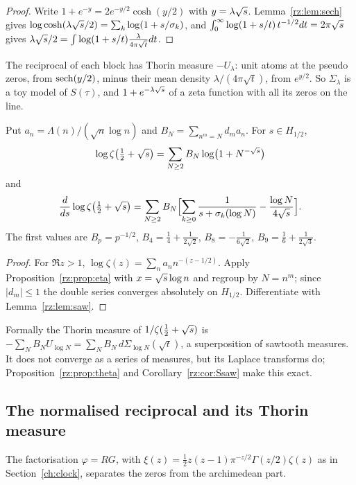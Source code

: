 \begin{proof}
Write $1+e^{-y}=2e^{-y/2}\cosh(y/2)$ with $y=\lambda\sqrt{s}$. Lemma~\ref{rz:lem:sech} gives $\log\cosh(\lambda\sqrt{s}/2)=\sum_k\log(1+s/\sigma_k)$, and $\int_0^\infty\log(1+s/t)\,t^{-1/2}dt=2\pi\sqrt{s}$ gives $\lambda\sqrt{s}/2=\int\log(1+s/t)\frac{\lambda}{4\pi\sqrt t}dt$.
\end{proof}

The reciprocal of each block has Thorin measure $-U_\lambda$: unit atoms at the pseudo zeros, from $\operatorname{sech}(y/2)$, minus their mean density $\lambda/(4\pi\sqrt t)$, from $e^{y/2}$. So $\Sigma_\lambda$ is a toy model of $S(\tau)$, and $1+e^{-\lambda\sqrt{s}}$ of a zeta function with all its zeros on the line.

\begin{theorem}\label{rz:thm:saw}
Put $a_n=\Lambda(n)/(\sqrt n\log n)$ and $B_N=\sum_{n^m=N}d_m a_n$. For $s\in H_{1/2}$,
\[
\log\zeta\bigl(\tfrac12+\sqrt{s}\bigr)=\sum_{N\ge2}B_N\log\bigl(1+N^{-\sqrt{s}}\bigr)
\]
and
\[
\frac{d}{ds}\log\zeta\bigl(\tfrac12+\sqrt{s}\bigr)=\sum_{N\ge2}B_N\Bigl[\sum_{k\ge0}\frac{1}{s+\sigma_k(\log N)}-\frac{\log N}{4\sqrt{s}}\Bigr].
\]
The first values are $B_p=p^{-1/2}$, $B_4=\frac14+\frac1{2\sqrt2}$, $B_8=-\frac1{6\sqrt2}$, $B_9=\frac16+\frac{1}{2\sqrt3}$.
\end{theorem}

\begin{proof}
For $\Re z>1$, $\log\zeta(z)=\sum_n a_n n^{-(z-1/2)}$. Apply Proposition~\ref{rz:prop:eta} with $x=\sqrt{s}\log n$ and regroup by $N=n^m$; since $|d_m|\le1$ the double series converges absolutely on $H_{1/2}$. Differentiate with Lemma~\ref{rz:lem:saw}.
\end{proof}

Formally the Thorin measure of $1/\zeta(\frac12+\sqrt{s})$ is $-\sum_NB_NU_{\log N}=\sum_NB_N\,d\Sigma_{\log N}(\sqrt t)$, a superposition of sawtooth measures. It does not converge as a series of measures, but its Laplace transforms do; Proposition~\ref{rz:prop:theta} and Corollary~\ref{rz:cor:Ssaw} make this exact.

\subsection{The normalised reciprocal and its Thorin measure}\label{rz:sec:thorin}

The factorisation $\varphi=RG$, with $\xi(z)=\frac12z(z-1)\pi^{-z/2}\Gamma(z/2)\zeta(z)$ as in Section~\ref{ch:clock}, separates the zeros from the archimedean part.

